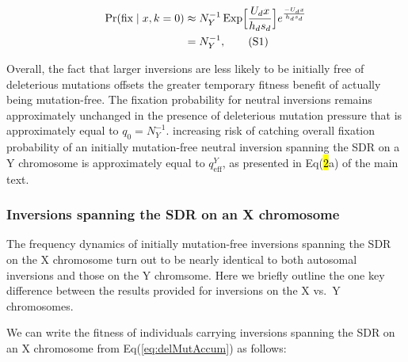 \documentclass[11pt]{article}
\newcommand\numberthis{\addtocounter{equation}{1}\tag{\theequation}}
\begin{document}
\begin{align*}\label{eq:NeutralYinvPFix}
		\Pr(\text{fix} \mid x, k = 0) &\approx N^{-1}_Y \, \text{Exp}\Big[ \frac{U_d x}{h_d s_d} \Big] e^{\frac{-U_d x}{h_d s_d}} \\
		 &= N^{-1}_Y , \numberthis
\end{align*}

Overall, the fact that larger inversions are less likely to be initially free of deleterious mutations offsets the greater temporary fitness benefit of actually being mutation-free. The fixation probability for neutral inversions remains approximately unchanged in the presence of deleterious mutation pressure that is approximately equal to $q_0 = N^{-1}_Y$. increasing risk of catching overall fixation probability of an initially mutation-free neutral inversion spanning the SDR on a Y chromosome is approximately equal to $q^Y_{\text{eff}}$, as presented in Eq(\hl{2}a) of the main text.



\subsubsection*{Inversions spanning the SDR on an X chromosome}

The frequency dynamics of initially mutation-free inversions spanning the SDR on the X chromosome turn out to be nearly identical to both autosomal inversions and those on the Y chromsome. Here we briefly outline the one key difference between the results provided for inversions on the X vs.~Y chromosomes. 

We can write the fitness of individuals carrying inversions spanning the SDR on an X chromosome from Eq(\ref{eq:delMutAccum}) as follows:
\end{document}

